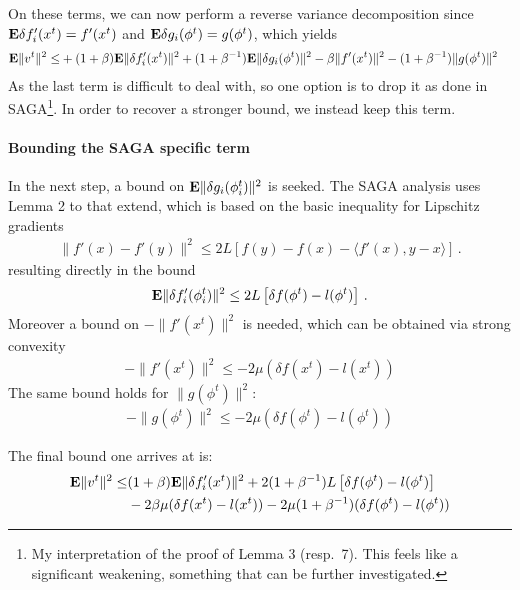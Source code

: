 \documentclass{article}
\newcommand{\E}{{\bf E}}
\begin{document}
On these terms, we can now perform a reverse variance decomposition since $\E  \delta f'_i(x^t) = f'(x^t)$ and $\E \delta g_i(\phi^t) = g(\phi^t)$, which yields 
\begin{align}
\E \| v^t \|^2 \leq &
+ (1+\beta) \E \| \delta f'_i(x^t) \|^2 + (1+\beta^{-1}) \E \|  \delta g_i(\phi^t) \|^2 -  \beta \| f'(x^t) \|^2 - (1+\beta^{-1}) \| g(\phi^t) \|^2
\end{align}
As the last term is difficult to deal with, so one option is to drop
it as done in SAGA\footnote{My interpretation of the proof of Lemma 3
  (resp.~7). This feels like a significant weakening, something that
  can be further investigated.}. In order to recover a stronger bound,
we instead keep this term.

\paragraph{Bounding the SAGA specific term}

In the next step, a bound on $\E \|  \delta g_i(\phi_i^t) \|^2$ is seeked. The SAGA analysis uses Lemma 2 to that extend, which is based on the basic inequality for Lipschitz gradients
\begin{align}
\| f'(x) - f'(y) \|^2 \leq 2L\left[ f(y) - f(x) - \langle f'(x), y-x \rangle \right] \,.
\end{align}
resulting directly in the bound 
\begin{align}
\E \|  \delta f'_i(\phi_i^t) \|^2 \leq 2L  \left[ \delta f(\phi^t) - l (\phi^t) \right] \,.
\label{eq:lipschitz}
\end{align}
Moreover a bound on $-\| f'(x^t) \|^2$ is needed, which can be obtained via strong convexity 
\begin{align}
-\| f'(x^t) \|^2 \leq - 2\mu ( \delta f(x^t) - l(x^t)) 
\label{eq:strong_convexity_f}
\end{align}
The same bound holds for $\| g(\phi^t) \|^2$:
\begin{align}
-\| g(\phi^t) \|^2 \leq - 2\mu ( \delta f(\phi^t) - l(\phi^t)) 
\label{eq:strong_convexity_g}
\end{align}

The final bound one arrives at is:
\begin{align}
\E \| v^t \|^2 \leq & (1+\beta) \E \|  \delta f'_i(x^t) \|^2 %
+ 2(1+\beta^{-1})L  \left[ \delta f(\phi^t) - l (\phi^t) \right] \nonumber \\
&- 2 \beta \mu ( \delta f(x^t) - l(x^t)) - 2 \mu (1+\beta^{-1}) ( \delta f(\phi^t) - l(\phi^t))
\end{align}
\end{document}
